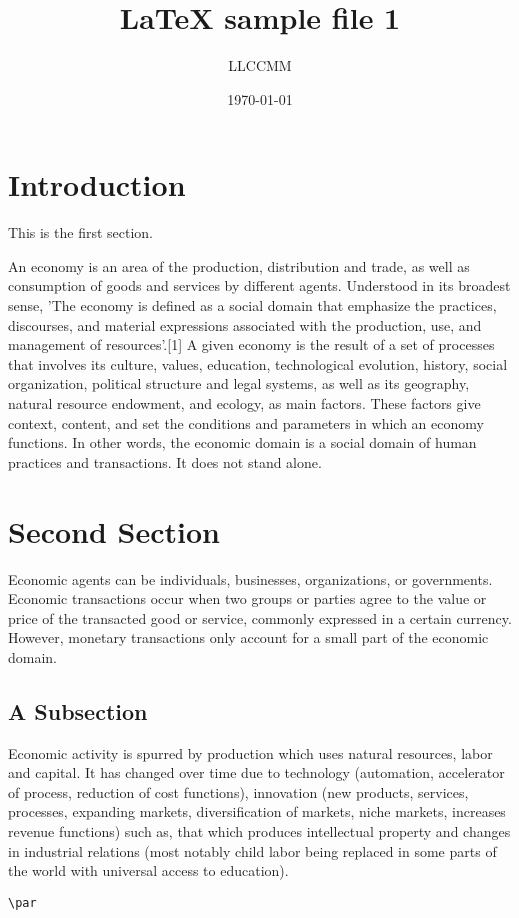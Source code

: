 \documentclass[12pt]{article}
\title{LaTeX sample file 1}
\author{LLCCMM}
\date{\today}
\begin{document}
\maketitle

\section{Introduction}

This is the first section.

An economy is an area of the production, distribution and trade, as well as consumption of goods and services by different agents. Understood in its broadest sense, 'The economy is defined as a social domain that emphasize the practices, discourses, and material expressions associated with the production, use, and management of resources'.[1] A given economy is the result of a set of processes that involves its culture, values, education, technological evolution, history, social organization, political structure and legal systems, as well as its geography, natural resource endowment, and ecology, as main factors. These factors give context, content, and set the conditions and parameters in which an economy functions. In other words, the economic domain is a social domain of human practices and transactions. It does not stand alone.

\section{Second Section}

Economic agents can be individuals, businesses, organizations, or governments. Economic transactions occur when two groups or parties agree to the value or price of the transacted good or service, commonly expressed in a certain currency. However, monetary transactions only account for a small part of the economic domain.

\subsection{A Subsection}

Economic activity is spurred by production which uses natural resources, labor and capital. It has changed over time due to technology (automation, accelerator of process, reduction of cost functions), innovation (new products, services, processes, expanding markets, diversification of markets, niche markets, increases revenue functions) such as, that which produces intellectual property and changes in industrial relations (most notably child labor being replaced in some parts of the world with universal access to education).

\verb+\par+
\end{document}
